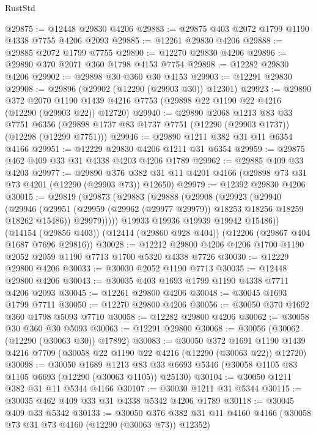 \begin{lexlean}{RustStd}
\begin{coremodule}
{\begin{coremodule}
{{{{{{{{{{{{{{{{{{{{{{{{{{{{{{{{{{{{{{{{{{{{{{{{{{@29875 := @12448 @29830 @4206
@29883 := @29875 @403 @2072 @1799 @1190 @4338 @7755 @4206 @2093
@29885 := @12261 @29830 @4206
@29888 := @29885 @2072 @1799 @7755
@29890 := @12270 @29830 @4206
@29896 := @29890 @370 @2071 @360 @1798 @4153 @7754
@29898 := @12282 @29830 @4206
@29902 := @29898 @30 @360 @30 @4153
@29903 := @12291 @29830
@29908 := @29896 (@29902 (@12290 (@29903 @30)) @12301)
@29923 := @29890
    @372
    @2070
    @1190
    @1439
    @4216
    @7753
    (@29898 @22 @1190 @22 @4216 (@12290 (@29903 @22)) @12720)
@29940 := @29890
    @2068
    @1213
    @83
    @33
    @7751
    @6356
    (@29898 @1737 @83 @1737 @7751 (@12290 (@29903 @1737)) (@12298 (@12299 @7751)))
@29946 := @29890 @1211 @382 @31 @11 @6354 @4166
@29951 := @12229 @29830 @4206 @1211 @31 @6354
@29959 := @29875 @462 @409 @33 @31 @4338 @4203 @4206 @1789
@29962 := @29885 @409 @33 @4203
@29977 := @29890
    @376
    @382
    @31
    @11
    @4201
    @4166
    (@29898 @73 @31 @73 @4201 (@12290 (@29903 @73)) @12650)
@29979 := @12392 @29830 @4206
@30015 := @29819
    (@29873
      (@29883
        (@29888
          (@29908
            (@29923
              (@29940
                (@29946
                  (@29951 (@29959 (@29962 (@29977 @29979)) @18253 @18256 @18259 @18262 @15486))
                  @29979)))))
        @19933
        @19936
        @19939
        @19942
        @15486))
    (@14154 (@29856 @403))
    (@12414 (@29860 @928 @404))
    (@12206 (@29867 @404 @1687 @7696 @29816))
@30028 := @12212 @29800 @4206 @4206 @1700 @1190 @2052 @2059 @1190 @7713 @1700 @5320 @4338 @7726
@30030 := @12229 @29800 @4206
@30033 := @30030 @2052 @1190 @7713
@30035 := @12448 @29800 @4206
@30043 := @30035 @403 @1693 @1799 @1190 @4338 @7711 @4206 @2093
@30045 := @12261 @29800 @4206
@30048 := @30045 @1693 @1799 @7711
@30050 := @12270 @29800 @4206
@30056 := @30050 @370 @1692 @360 @1798 @5093 @7710
@30058 := @12282 @29800 @4206
@30062 := @30058 @30 @360 @30 @5093
@30063 := @12291 @29800
@30068 := @30056 (@30062 (@12290 (@30063 @30)) @17892)
@30083 := @30050
    @372
    @1691
    @1190
    @1439
    @4216
    @7709
    (@30058 @22 @1190 @22 @4216 (@12290 (@30063 @22)) @12720)
@30098 := @30050
    @1689
    @1213
    @83
    @33
    @6693
    @5346
    (@30058 @1105 @83 @1105 @6693 (@12290 (@30063 @1105)) @25130)
@30104 := @30050 @1211 @382 @31 @11 @5344 @4166
@30107 := @30030 @1211 @31 @5344
@30115 := @30035 @462 @409 @33 @31 @4338 @5342 @4206 @1789
@30118 := @30045 @409 @33 @5342
@30133 := @30050
    @376
    @382
    @31
    @11
    @4160
    @4166
    (@30058 @73 @31 @73 @4160 (@12290 (@30063 @73)) @12352)
}}}}}}}}}}}}}}}}}}}}}}}}}}}}}}}}}}}}}}}}}}}}}}}}}}
\end{coremodule}}
\end{coremodule}
\end{lexlean}
